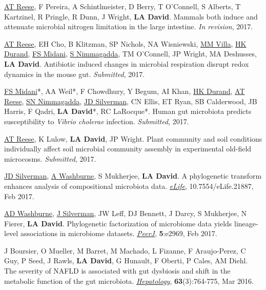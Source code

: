 \documentclass[overlapped,line,11pt]{res}
\begin{document}
\begin{resume}
\begin{revnumerate}[20]

\item {\underline{AT Reese}, F Pereira, A Schintlmeister, D Berry, T
  O'Connell, S Alberts, T Kartzinel, R Pringle, R Dunn, J Wright,
  \textbf{LA David}. Mammals both induce and attenuate microbial
  nitrogen limitation in the large intestine. \emph{In revision},
  2017.}

\item {\underline{AT Reese}, EH Cho, B Klitzman, SP Nichols, NA
  Wisniewski, \underline{MM Villa}, \underline{HK Durand},
  \underline{FS Midani}, \underline{S Nimmagadda}, TM O’Connell, JP
  Wright, MA Deshusses, \textbf{LA David}. Antibiotic induced changes in
  microbial respiration disrupt redox dynamics in the mouse
  gut. \emph{Submitted}, 2017.}

\item {\underline{FS Midani}*, AA Weil*, F Chowdhury, Y Begum, AI Khan, \underline{HK Durand},
  \underline{AT Reese}, \underline{SN Nimmagadda}, \underline{JD Silverman}, CN Ellis, ET Ryan, SB
  Calderwood, JB Harris, F Qadri, \textbf{LA David}*, RC LaRocque*. Human gut
  microbiota predicts susceptibility to \emph{Vibrio cholerae} infection. \emph{Submitted}, 2017.}

\item {\underline{AT Reese}, K Lulow, \textbf{LA David}, JP Wright. Plant
  community and soil conditions individually affect soil microbial
  community assembly in experimental old-field
  microcosms. \emph{Submitted}, 2017.}

\item {\underline{JD Silverman}, \underline{A Washburne}, S Mukherjee, \textbf{LA David}. A
  phylogenetic transform enhances analysis of compositional microbiota
  data. \emph{\underline{eLife}}, 10.7554/eLife.21887, Feb 2017.}

\item {\underline{AD Washburne}, \underline{J Silverman}, JW Leff, DJ
  Bennett, J Darcy, S Mukherjee, N Fierer, \textbf{LA
    David}. Phylogenetic factorization of microbiome data yields
  lineage-level associations in microbiome
  datasets. \emph{\underline{PeerJ}}, \textbf{5}:e2969, Feb 2017.}

\item {J Boursier, O Mueller, M Barret, M Machado, L Fizanne, F
  Araujo-Perez, C Guy, P Seed, J Rawls, \textbf{LA David}, G Hunault, F
  Oberti, P Cales, AM Diehl. The severity of NAFLD is associated with
  gut dysbiosis and shift in the metabolic function of the gut
  microbiota. \emph{\underline{Hepatology}}, \textbf{63}(3):764-775, Mar 2016.}


\end{revnumerate}
\end{resume}
\end{document}
